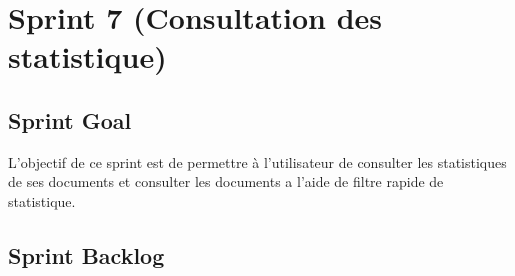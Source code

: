 \section{Sprint 7 (Consultation des statistique)}

\subsection{Sprint Goal}
L'objectif de ce sprint est de permettre à l'utilisateur de consulter les statistiques de ses documents et consulter les documents a l'aide de filtre rapide de statistique.

\subsection{Sprint Backlog}



